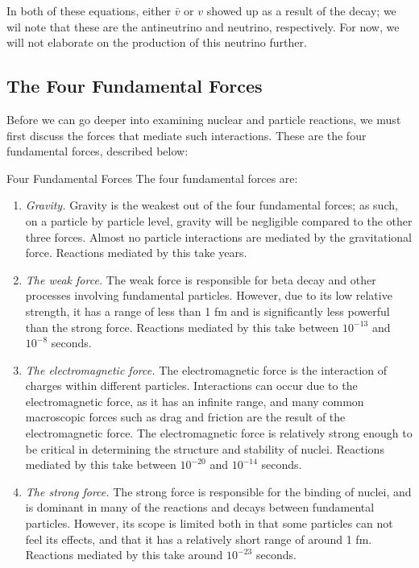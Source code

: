 \documentclass{article}
\begin{document}
In both of these equations, either $\bar v$ or $v$ showed up as a result of the decay; we wil note that these are the antineutrino and neutrino, respectively. For now, we will not elaborate on the production of this neutrino further. 

\newpage
\subsection{The Four Fundamental Forces}

Before we can go deeper into examining nuclear and particle reactions, we must first discuss the forces that mediate such interactions. These are the four fundamental forces, described below:

\begin{defi}{Four Fundamental Forces}
    The four fundamental forces are:
    \begin{enumerate}
        \item \textit{Gravity.} Gravity is the weakest out of the four fundamental forces; as such, on a particle by particle level, gravity will be negligible compared to the other three forces. Almost no particle interactions are mediated by the gravitational force. Reactions mediated by this take years. 
        \item \textit{The weak force.} The weak force is responsible for beta decay and other processes involving fundamental particles. However, due to its low relative strength, it has a range of less than 1 fm and is significantly less powerful than the strong force. Reactions mediated by this take between $10^{-13}$ and $10^{-8}$ seconds.
        \item \textit{The electromagnetic force.} The electromagnetic force is the interaction of charges within different particles. Interactions can occur due to the electromagnetic force, as it has an infinite range, and many common macroscopic forces such as drag and friction are the result of the electromagnetic force. The electromagnetic force is relatively strong enough to be critical in determining the structure and stability of nuclei. Reactions mediated by this take between $10^{-20}$ and $10^{-14}$ seconds. 
        \item \textit{The strong force.} The strong force is responsible for the binding of nuclei, and is dominant in many of the reactions and decays between fundamental particles. However, its scope is limited both in that some particles can not feel its effects, and that it has a relatively short range of around 1 fm. Reactions mediated by this take around $10^{-23}$ seconds.
    \end{enumerate}
\end{defi}
\end{document}
